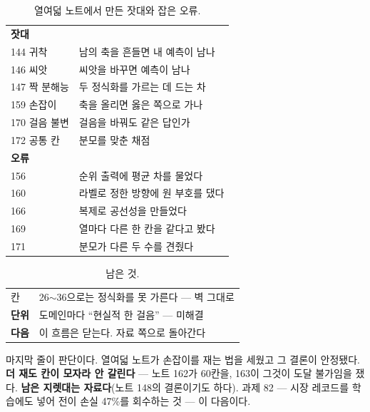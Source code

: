\documentclass[10pt]{article}
\begin{document}
\begin{table}[t]
\centering\tsize
\caption{열여덟 노트에서 만든 잣대와 잡은 오류.}
\begin{tabular}{ll}
\toprule
\textbf{잣대} & \\
144 귀착 & 남의 축을 흔들면 내 예측이 남나 \\
146 씨앗 & 씨앗을 바꾸면 예측이 남나 \\
147 짝 분해능 & 두 정식화를 가르는 데 드는 차 \\
159 손잡이 & 축을 올리면 옳은 쪽으로 가나 \\
170 걸음 불변 & 걸음을 바꿔도 같은 답인가 \\
172 공통 칸 & 분모를 맞춘 채점 \\
\midrule
\textbf{오류} & \\
156 & 순위 출력에 평균 차를 물었다 \\
160 & 라벨로 정한 방향에 원 부호를 댔다 \\
166 & 복제로 공선성을 만들었다 \\
169 & 열마다 다른 한 칸을 같다고 봤다 \\
171 & 분모가 다른 두 수를 견줬다 \\
\bottomrule
\end{tabular}
\end{table}



\begin{table}[t]
\centering\tsize
\caption{남은 것.}
\begin{tabular}{ll}
\toprule
칸 & 26$\sim$36으로는 정식화를 못 가른다 --- 벽 그대로 \\
\textbf{단위} & 도메인마다 ``현실적 한 걸음'' --- 미해결 \\
\textbf{다음} & 이 흐름은 닫는다. 자료 쪽으로 돌아간다 \\
\bottomrule
\end{tabular}
\end{table}

마지막 줄이 판단이다. 열여덟 노트가 손잡이를 재는 법을 세웠고 그 결론이
안정됐다. \textbf{더 재도 칸이 모자라 안 갈린다} --- 노트 162가 60칸을,
163이 그것이 도달 불가임을 쟀다. \textbf{남은 지렛대는 자료다}(노트 148의
결론이기도 하다). 과제 82 --- 시장 레코드를 학습에도 넣어 전이 손실
47\%를 회수하는 것 --- 이 다음이다.
\end{document}
